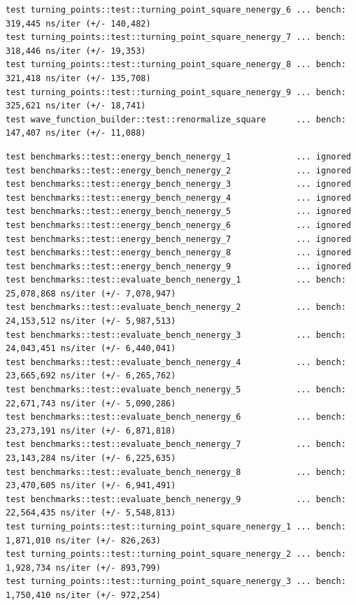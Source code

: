 \documentclass[11pt,DIV=10,final]{scrreprt} %
\begin{document}
\begin{appendix}
{\begin{lstlisting}[caption={
Test run on machine 1, the energy tests were ignored because they take about 2 hours to run.
}]
test turning_points::test::turning_point_square_nenergy_6 ... bench:     319,445 ns/iter (+/- 140,482)
test turning_points::test::turning_point_square_nenergy_7 ... bench:     318,446 ns/iter (+/- 19,353)
test turning_points::test::turning_point_square_nenergy_8 ... bench:     321,418 ns/iter (+/- 135,708)
test turning_points::test::turning_point_square_nenergy_9 ... bench:     325,621 ns/iter (+/- 18,741)
test wave_function_builder::test::renormalize_square      ... bench:     147,407 ns/iter (+/- 11,088)
\end{lstlisting}
\vspace*{3ex}
\begin{lstlisting}[caption={
Test on machine 2 (specs~\ref{specs:m2}).
}]
test benchmarks::test::energy_bench_nenergy_1             ... ignored
test benchmarks::test::energy_bench_nenergy_2             ... ignored
test benchmarks::test::energy_bench_nenergy_3             ... ignored
test benchmarks::test::energy_bench_nenergy_4             ... ignored
test benchmarks::test::energy_bench_nenergy_5             ... ignored
test benchmarks::test::energy_bench_nenergy_6             ... ignored
test benchmarks::test::energy_bench_nenergy_7             ... ignored
test benchmarks::test::energy_bench_nenergy_8             ... ignored
test benchmarks::test::energy_bench_nenergy_9             ... ignored
test benchmarks::test::evaluate_bench_nenergy_1           ... bench:  25,078,868 ns/iter (+/- 7,078,947)
test benchmarks::test::evaluate_bench_nenergy_2           ... bench:  24,153,512 ns/iter (+/- 5,987,513)
test benchmarks::test::evaluate_bench_nenergy_3           ... bench:  24,043,451 ns/iter (+/- 6,440,041)
test benchmarks::test::evaluate_bench_nenergy_4           ... bench:  23,665,692 ns/iter (+/- 6,265,762)
test benchmarks::test::evaluate_bench_nenergy_5           ... bench:  22,671,743 ns/iter (+/- 5,090,286)
test benchmarks::test::evaluate_bench_nenergy_6           ... bench:  23,273,191 ns/iter (+/- 6,871,818)
test benchmarks::test::evaluate_bench_nenergy_7           ... bench:  23,143,284 ns/iter (+/- 6,225,635)
test benchmarks::test::evaluate_bench_nenergy_8           ... bench:  23,470,605 ns/iter (+/- 6,941,491)
test benchmarks::test::evaluate_bench_nenergy_9           ... bench:  22,564,435 ns/iter (+/- 5,548,813)
test turning_points::test::turning_point_square_nenergy_1 ... bench:   1,871,010 ns/iter (+/- 826,263)
test turning_points::test::turning_point_square_nenergy_2 ... bench:   1,928,734 ns/iter (+/- 893,799)
test turning_points::test::turning_point_square_nenergy_3 ... bench:   1,750,410 ns/iter (+/- 972,254)

\end{lstlisting}}
\end{appendix}
\end{document}
